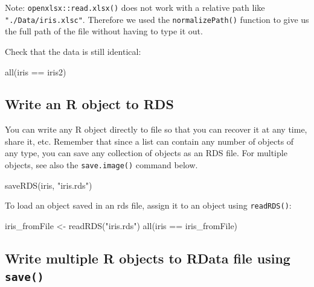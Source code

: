 \documentclass[
]{book}
\newenvironment{Shaded}{\begin{snugshade}}{\end{snugshade}}
\newcommand{\FunctionTok}[1]{\textcolor[rgb]{0.00,0.00,0.00}{#1}}
\newcommand{\NormalTok}[1]{#1}
\newcommand{\OtherTok}[1]{\textcolor[rgb]{0.56,0.35,0.01}{#1}}
\newcommand{\SpecialCharTok}[1]{\textcolor[rgb]{0.00,0.00,0.00}{#1}}
\newcommand{\StringTok}[1]{\textcolor[rgb]{0.31,0.60,0.02}{#1}}
\begin{document}
Note: \texttt{openxlsx::read.xlsx()} does not work with a relative path like \texttt{"./Data/iris.xlsc"}. Therefore we used the \texttt{normalizePath()} function to give us the full path of the file without having to type it out.

Check that the data is still identical:

\begin{Shaded}
\begin{Highlighting}[]
\FunctionTok{all}\NormalTok{(iris }\SpecialCharTok{==}\NormalTok{ iris2)}
\end{Highlighting}
\end{Shaded}

\hypertarget{write-an-r-object-to-rds}{%
\subsection{Write an R object to RDS}\label{write-an-r-object-to-rds}}

You can write any R object directly to file so that you can recover it at any time, share it, etc. Remember that since a list can contain any number of objects of any type, you can save any collection of objects as an RDS file. For multiple objects, see also the \texttt{save.image()} command below.

\begin{Shaded}
\begin{Highlighting}[]
\FunctionTok{saveRDS}\NormalTok{(iris, }\StringTok{"iris.rds"}\NormalTok{)}
\end{Highlighting}
\end{Shaded}

To load an object saved in an rds file, assign it to an object using \texttt{readRDS()}:

\begin{Shaded}
\begin{Highlighting}[]
\NormalTok{iris\_fromFile }\OtherTok{\textless{}{-}} \FunctionTok{readRDS}\NormalTok{(}\StringTok{"iris.rds"}\NormalTok{)}
\FunctionTok{all}\NormalTok{(iris }\SpecialCharTok{==}\NormalTok{ iris\_fromFile)}
\end{Highlighting}
\end{Shaded}

\hypertarget{write-multiple-r-objects-to-rdata-file-using-save}{%
\subsection{\texorpdfstring{Write multiple R objects to RData file using \texttt{save()}}{Write multiple R objects to RData file using save()}}\label{write-multiple-r-objects-to-rdata-file-using-save}}
\end{document}
